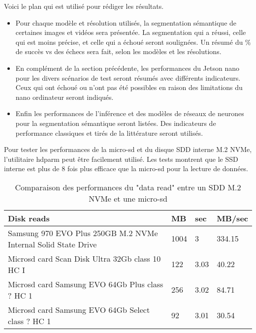 ﻿{
   \color{red}
   \par Voici le plan qui est utilisé pour rédiger les résultats.
   \begin{itemize}
      \item \label{resultat1}Pour chaque modèle et résolution utilisés, la segmentation sémantique de certaines images et vidéos sera présentée. La segmentation qui a réussi, celle qui est moins précise, et celle qui a échoué seront soulignées. Un résumé du \% de succès vs des échecs sera fait, selon les modèles et les résolutions. 
      \item En complément de la section précédente, les performances du Jetson nano pour les divers scénarios de test seront résumés avec différents indicateurs. Ceux qui ont échoué ou n'ont pas été possibles en raison des limitations du nano ordinateur seront indiqués. 
      \item Enfin les performances de l'inférence et des modèles de réseaux de neurones pour la segmentation sémantique seront listées. Des indicateurs de performance classiques et tirés de la littérature seront utilisés.
   \end{itemize}
}
\par Pour tester les performances de la micro-sd et du disque SDD interne M.2 NVMe, l'utilitaire hdparm peut être facilement utilisé. Les tests montrent que le SSD interne est plus de 8 fois plus efficace que la micro-sd pour la lecture de données. 
{
   \centering
   \vspace{0.3em} %
   \renewcommand*{\arraystretch}{1.4}
   \begin{longtable}[t]{@{}|p{25em}|p{2em}|p{2em}|p{3em}|@{}} 
      \caption{Comparaison des performances du "data read" entre un SDD M.2 NVMe et une micro-sd}\label{tab:Timing O_DIRECT disk reads}\\
      \hline
      \textbf{Disk reads} & \textbf{MB} & \textbf{sec} & \textbf{MB/sec}\\
      \hline
      Samsung 970 EVO Plus 250GB M.2 NVMe Internal Solid State Drive & 1004 & 3 & 334.15\\
      \hline
      Microsd card Scan Disk Ultra 32Gb class 10 HC I & 122 & 3.03 & 40.22\\
      \hline
      Microsd card Samsung EVO 64Gb Plus class ? HC 1 & 256 & 3.02 & 84.71\\
      \hline
      Microsd card Samsung EVO 64Gb Select class ? HC 1 & 92 & 3.01 & 30.54\\
      \hline
   \end{longtable}
}